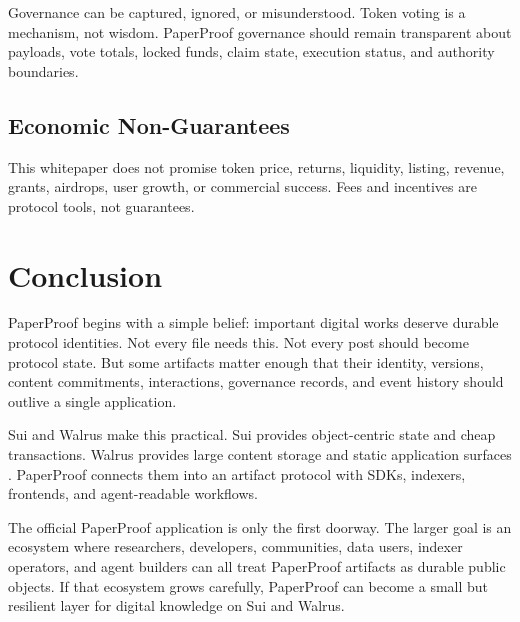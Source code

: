 \documentclass[11pt]{article}
\begin{document}
Governance can be captured, ignored, or misunderstood. Token voting is a
mechanism, not wisdom. PaperProof governance should remain transparent about
payloads, vote totals, locked funds, claim state, execution status, and authority
boundaries.

\subsection{Economic Non-Guarantees}

This whitepaper does not promise token price, returns, liquidity, listing,
revenue, grants, airdrops, user growth, or commercial success. Fees and
incentives are protocol tools, not guarantees.

\section{Conclusion}

PaperProof begins with a simple belief: important digital works deserve durable
protocol identities. Not every file needs this. Not every post should become
protocol state. But some artifacts matter enough that their identity, versions,
content commitments, interactions, governance records, and event history should
outlive a single application.

Sui and Walrus make this practical. Sui provides object-centric state and cheap
transactions. Walrus provides large content storage and static application
surfaces \cite{sui_platform,sui_move,walrus_storage}. PaperProof connects them into an artifact protocol with SDKs, indexers,
frontends, and agent-readable workflows.

The official PaperProof application is only the first doorway. The larger goal is
an ecosystem where researchers, developers, communities, data users, indexer
operators, and agent builders can all treat PaperProof artifacts as durable
public objects. If that ecosystem grows carefully, PaperProof can become a small
but resilient layer for digital knowledge on Sui and Walrus.
\end{document}
